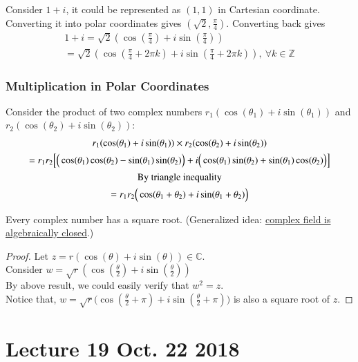 \documentclass[10pt]{article}
\begin{document}
		\begin{example}
			Consider $1+i$, it could be represented as $(1,1)$ in Cartesian coordinate. Converting it into polar coordinates gives $(\sqrt{2}, \frac{\pi}{4})$. Converting back gives
			\begin{gather*}
				1 + i = \sqrt{2}(\cos(\frac{\pi}{4}) + i \sin(\frac{\pi}{4})) \\
				= \sqrt{2} (\cos(\frac{\pi}{4} + 2\pi k) + i \sin(\frac{\pi}{4} + 2 \pi k)),\ \forall k \in \mathbb{Z}
			\end{gather*}
		\end{example}
		
		\subsubsection{Multiplication in Polar Coordinates}
		\par Consider the product of two complex numbers $r_1 (\cos(\theta_1) + i \sin(\theta_1))$ and $r_2 (\cos(\theta_2) + i \sin(\theta_2))$:
		\begin{gather*}
			r_1 (\cos(\theta_1) + i \sin(\theta_1)) \times r_2 (\cos(\theta_2) + i \sin(\theta_2)) \\
			= r_1 r_2 \Big[
				\Big(\cos(\theta_1) \cos(\theta_2)
				 - \sin(\theta_1) \sin(\theta_2) \Big) + 
				 i \Big(
				 	\cos(\theta_1)\sin(\theta_2) + \sin(\theta_1) \cos(\theta_2)
				 \Big)
				\Big] \\
			\text{{By triangle inequality}} \\
			= r_1 r_2 \Big ( \cos(\theta_1 + \theta_2) + i \sin(\theta_1 + \theta_2)\Big)
		\end{gather*}
		
		\begin{example}
			Every complex number has a square root. (Generalized idea: \ul{complex field is algebraically closed}.)
			\begin{proof}
				Let $z = r(\cos(\theta) + i \sin(\theta)) \in \mathbb{C}$. \\
				Consider $w = \sqrt{r} (\cos(\frac{\theta}{2}) + i \sin(\frac{\theta}{2}))$ \\
				By above result, we could easily verify that $w^2 = z$. \\
				Notice that, $w = \sqrt{r}\Big(\cos(\frac{\theta}{2} + \pi) + i \sin(\frac{\theta}{2} + \pi) \Big)$ is also a square root of $z$.
			\end{proof}
		\end{example}
	
	\section{Lecture 19 Oct. 22 2018}
\end{document}
